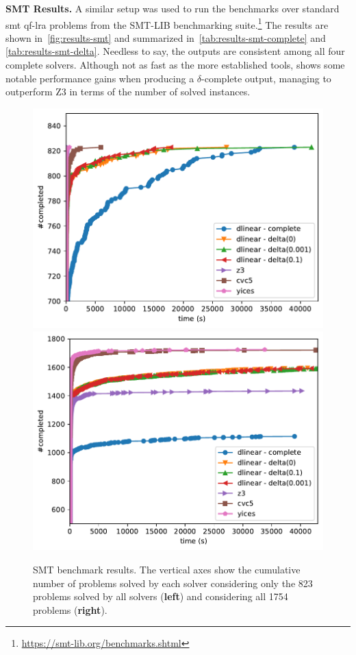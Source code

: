 \documentclass[runningheads]{llncs}
\begin{document}
\smallskip
\noindent\textbf{SMT Results.}
A similar setup was used to run the benchmarks over standard \gls{smt} \gls{qf-lra} problems from the SMT-LIB benchmarking suite.\footnote{\url{https://smt-lib.org/benchmarks.shtml}}
The results are shown in~\autoref{fig:results-smt} and summarized in~\autoref{tab:results-smt-complete} and \autoref{tab:results-smt-delta}.
Needless to say, the outputs are consistent among all four complete solvers.
Although not as fast as the more established tools, \dlinear shows some notable performance gains when producing a $\delta$-complete output, managing to outperform Z3 in terms of the number of solved instances.


\begin{figure}
    \centering
    \includegraphics[width=0.45\linewidth]{img/on_file_smt.pdf}
    \hspace{1cm}
    \includegraphics[width=0.45\linewidth]{img/total_smt.pdf}
    \caption{SMT benchmark results. The vertical axes show the cumulative number of problems solved by each solver considering only the 823 problems solved by all solvers (\textbf{left}) and considering all 1754 problems (\textbf{right}). 
    }
    \label{fig:results-smt}
\end{figure}
\end{document}
